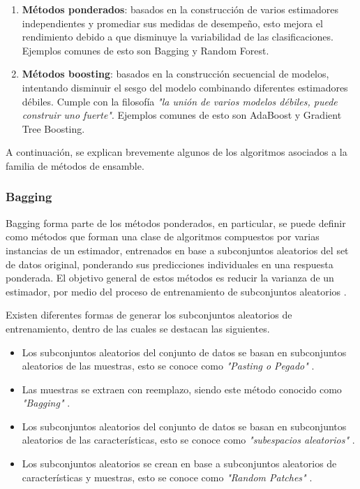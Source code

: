 \begin{enumerate}
	
	\item \textbf{Métodos ponderados}: basados en la construcción de varios estimadores independientes y promediar sus medidas de desempeño, esto mejora el rendimiento debido a que disminuye la variabilidad de las clasificaciones. Ejemplos comunes de esto son Bagging y Random Forest.
	
	\item \textbf{Métodos boosting}: basados en la construcción secuencial de modelos, intentando disminuir el sesgo del modelo combinando diferentes estimadores débiles. Cumple con la filosofía \textit{"la unión de varios modelos débiles, puede construir uno fuerte"}. Ejemplos comunes de esto son AdaBoost y Gradient Tree Boosting.
	
\end{enumerate}

A continuación, se explican brevemente algunos de los algoritmos asociados a la familia de métodos de ensamble.

\subsubsection{Bagging}

Bagging forma parte de los métodos ponderados, en particular, se puede definir como métodos que forman una clase de algoritmos compuestos por varias instancias de un estimador, entrenados en base a subconjuntos aleatorios del set de datos original, ponderando sus predicciones individuales en una respuesta ponderada. El objetivo general de estos métodos es reducir la varianza de un estimador, por medio del proceso de entrenamiento de subconjuntos aleatorios \cite{breiman1996bagging}. 

Existen diferentes formas de generar los subconjuntos aleatorios de entrenamiento, dentro de las cuales se destacan las siguientes.

\begin{itemize}
	
	\item Los subconjuntos aleatorios del conjunto de datos se basan en subconjuntos aleatorios de las muestras, esto se conoce como \textit{"Pasting o Pegado"} \cite{breiman1999pasting}. 
	
	\item Las muestras se extraen con reemplazo, siendo este método conocido como \textit{"Bagging"} \cite{breiman1996bagging}.
	
	\item Los subconjuntos aleatorios del conjunto de datos se basan en subconjuntos aleatorios de las características, esto se conoce como \textit{"subespacios aleatorios"} \cite{barandiaran1998random}.
	
	\item Los subconjuntos aleatorios se crean en base a subconjuntos aleatorios de características y muestras, esto se conoce como \textit{"Random Patches"} \cite{ref10.1007/978-3-642-33460-3_28}.
	
\end{itemize}

